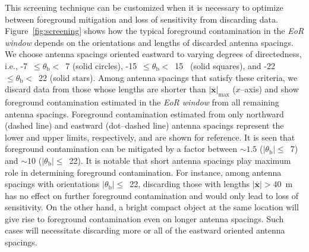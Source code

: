 \documentclass[preprint2,iop,numberedappendix]{emulateapj}
\begin{document}
This screening technique can be customized when it is necessary to optimize between foreground mitigation and loss of sensitivity from discarding data. Figure~\ref{fig:screening} shows how the typical foreground contamination in the {\it EoR window} depends on the orientations and lengths of discarded antenna spacings. We choose antenna spacings oriented eastward to varying degrees of directedness, i.e., -7~$\le\theta_\textrm{b}<$~7 (solid circles), -15\arcdeg~$\le\theta_\textrm{b}<$~15\arcdeg~ (solid squares), and -22~$\le\theta_\textrm{b}<$~22 (solid stars). Among antenna spacings that satisfy these criteria, we discard data from those whose lengths are shorter than $|\overline{\mathbf{x}}|_\textrm{max}$ ($x$--axis) and show foreground contamination estimated in the {\it EoR window} from all remaining antenna spacings. Foreground contamination estimated from only northward (dashed line) and eastward (dot--dashed line) antenna spacings represent the lower and upper limits, respectively, and are shown for reference. It is seen that foreground contamination can be mitigated by a factor between $\sim 1.5$ ($|\theta_\textrm{b}|\le$~7) and $\sim 10$ ($|\theta_\textrm{b}|\le$~22). It is notable that short antenna spacings play maximum role in determining foreground contamination. For instance, among antenna spacings with orientations $|\theta_\textrm{b}|\le$~22, discarding those with lengths $|\overline{\mathbf{x}}|>40$~m has no effect on further foreground contamination and would only lead to loss of sensitivity. On the other hand, a bright compact object at the same location will give rise to foreground contamination even on longer antenna spacings. Such cases will necessitate discarding more or all of the eastward oriented antenna spacings.
\end{document}
